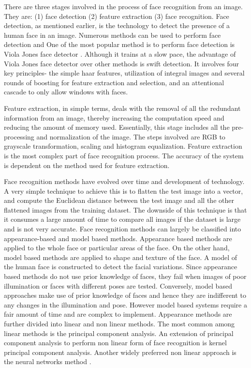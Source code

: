 \documentclass[conference]{IEEEtran}
\begin{document}
There are three stages involved in the process of face recognition from an image. They are: (1) face detection (2) feature extraction (3) face recognition. Face detection, as mentioned earlier, is the technology to detect the presence of a human face in an image. Numerous methods can be used to perform face detection and One of the most popular method is to perform face detection is Viola Jones face detector \cite{zafeiriou2015survey}. Although it trains at a slow pace, the advantage of Viola Jones face detector over other methods is swift detection. It involves four key principles- the simple haar features, utilization of integral images and several rounds of boosting for feature extraction and selection, and an attentional cascade to only allow windows with faces\cite{zafeiriou2015survey}.

Feature extraction, in simple terms, deals with the removal of all the redundant information from an image, thereby increasing the computation speed and reducing the amount of memory used. Essentially, this stage includes all the pre-processing and normalization of the image. The steps involved are RGB to grayscale transformation, scaling and histogram equalization. Feature extraction is the most complex part of face recognition process. The accuracy of the system is dependent on the method used for feature extraction.

Face recognition methods have evolved over time and development of technology. A very simple technique to achieve this is to flatten the test image into a vector, and compute the Euclidean distance between the test image and all the other flattened images from the training dataset. The downside of this technique is that it consumes a large amount of time to compare all images if the dataset is large and is not very accurate. Face recognition methods can largely be classified into appearance-based and model based methods. Appearance based methods are applied to the whole face or particular areas of the face. On the other hand, model based methods are applied to shape and texture of the face. A model of the human face is constructed to detect the facial variations. Since appearance based methods do not use prior knowledge of faces, they fail when images of poor illumination or faces with different poses are tested. Conversely, model based approaches  make use of prior knowledge of faces and hence they are indifferent to any changes in the illumination and pose. However model based systems require a fair amount of time and are complex to implement. Appearance methods are further divided into linear and non linear methods. The most common among linear methods is the principal component analysis. An extension of principal component analysis to perform non linear form of face recognition is kernel principal component analysis. Another widely preferred non linear approach is the neural networks method \cite{agrawal2015evaluation}.
\end{document}
